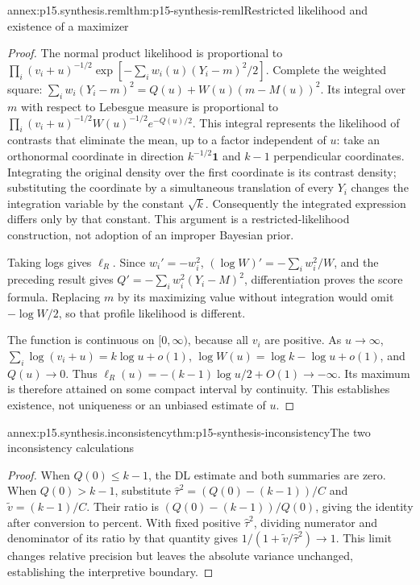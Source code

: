 \begin{annexitem}{annex:p15.synthesis.reml}{thm:p15-synthesis-reml}{Restricted likelihood and existence of a maximizer}
\begin{proof}
The normal product likelihood is proportional to
\(\prod_i(v_i+u)^{-1/2}
\exp[-\sum_iw_i(u)(Y_i-m)^2/2]\).
Complete the weighted square:
\(\sum_iw_i(Y_i-m)^2=Q(u)+W(u)(m-M(u))^2\).
Its integral over \(m\) with respect to Lebesgue measure is proportional to
\(\prod_i(v_i+u)^{-1/2}W(u)^{-1/2}e^{-Q(u)/2}\).
This integral represents the likelihood of contrasts that eliminate the
mean, up to a factor independent of \(u\): take an orthonormal coordinate
in direction \(k^{-1/2}\mathbf1\) and \(k-1\) perpendicular
coordinates. Integrating the original density over the first coordinate
is its contrast density; substituting the coordinate by a simultaneous
translation of every \(Y_i\) changes the integration variable by
the constant \(\sqrt k\). Consequently the integrated expression differs
only by that constant. This argument is a restricted-likelihood construction,
not adoption of an improper Bayesian prior.

Taking logs gives \(\ell_R\). Since \(w_i'=-w_i^2\),
\((\log W)'=-\sum_iw_i^2/W\), and the preceding result gives
\(Q'=-\sum_iw_i^2(Y_i-M)^2\), differentiation proves the score formula.
Replacing \(m\) by its maximizing value without integration would omit
\(-\log W/2\), so that profile likelihood is different.

The function is continuous on \([0,\infty)\), because all \(v_i\)
are positive. As \(u\to\infty\),
\(\sum_i\log(v_i+u)=k\log u+o(1)\),
\(\log W(u)=\log k-\log u+o(1)\), and \(Q(u)\to0\).
Thus \(\ell_R(u)=-(k-1)\log u/2+O(1)\to-\infty\).
Its maximum is therefore attained on some compact interval by continuity.
This establishes existence, not uniqueness or an unbiased estimate of \(u\).
\end{proof}
\end{annexitem}

\begin{annexitem}{annex:p15.synthesis.inconsistency}{thm:p15-synthesis-inconsistency}{The two inconsistency calculations}
\begin{proof}
When \(Q(0)\leq k-1\), the DL estimate and both summaries are zero.
When \(Q(0)>k-1\), substitute
\(\widehat\tau^2=(Q(0)-(k-1))/C\) and
\(\widetilde v=(k-1)/C\). Their ratio is
\((Q(0)-(k-1))/Q(0)\), giving the identity after conversion to percent.
With fixed positive \(\widehat\tau^2\), dividing numerator and
denominator of its ratio by that quantity gives
\(1/(1+\widetilde v/\widehat\tau^2)\to1\).
This limit changes relative precision but leaves the absolute variance
unchanged, establishing the interpretive boundary.
\end{proof}
\end{annexitem}

